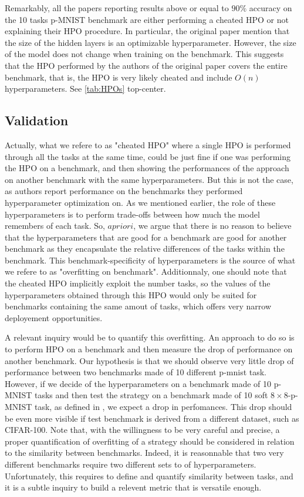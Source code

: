 \documentclass[11pt]{article}
\begin{document}
\vspace{1mm}
\noindent
Remarkably, all the papers reporting results above or equal to $90\%$ accuracy on the 10 tasks p-MNIST benchmark are either performing a cheated HPO or not explaining their HPO procedure. In particular, the original paper mention that the size of the hidden layers is an optimizable hyperparameter. However, the size of the model does not change when training on the benchmark. This suggests that the HPO performed by the authors of the original paper covers the entire benchmark, that is, the HPO is very likely cheated and include $O(n)$ hyperparameters. See \ref{tab:HPOs} top-center.


\subsection{Validation}


Actually, what we refere to as "cheated HPO" where a single HPO is performed through all the tasks at the same time, could be just fine if one was performing the HPO on a benchmark, and then showing the performances of the approach on another benchmark with the same hyperparameters. But this is not the case, as authors report performance on the benchmarks they performed hyperparameter optimization on. As we mentioned earlier, the role of these hyperparameters is to perform trade-offs between how much the model remembers of each task. So, $a priori$, we argue that there is no reason to believe that the hyperparameters that are good for a benchmark are good for another benchmark as they encapsulate the relative differences of the tasks within the benchmark. This benchmark-specificity of hyperparameters is the source of what we refere to as "overfitting on benchmark". Additionnaly, one should note that the cheated HPO implicitly exploit the number tasks, so the values of the hyperparameters obtained through this HPO would only be suited for benchmarks containing the same amout of tasks, which offers very narrow deployement opportunities. 

\vspace{1mm}
\noindent
A relevant inquiry would be to quantify this overfitting. An approach to do so is to perform HPO on a benchmark and then measure the drop of performance on another benchmark. Our hypothesis is that we should observe very little drop of performance between two benchmarks made of 10 different p-mnist task. However, if we decide of the hyperparameters on a benchmark made of 10 p-MNIST tasks and then test the strategy on a benchmark made of 10 soft $8\times8$-p-MNIST task, as defined in \cite{EWC}, we expect a drop in perfomances. This drop should be even more visible if test benchmark is derived from a different dataset, such as CIFAR-100. Note that, with the willingness to be very careful and precise, a proper quantification of overfitting of a strategy should be considered in relation to the similarity between benchmarks. Indeed, it is reasonnable that two very different benchmarks require two different sets to of hyperparameters. Unfortunately, this requires to define and quantify similarity between tasks, and it is a subtle inquiry to build a relevent metric that is versatile enough.
\end{document}
